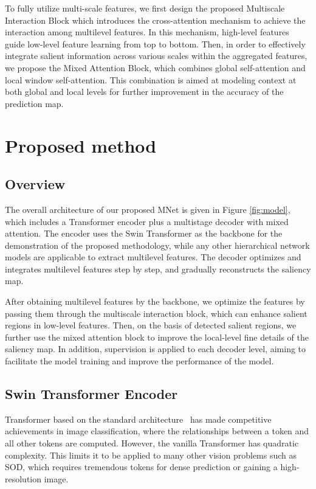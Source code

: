 \documentclass[lettersize,journal]{IEEEtran}
\begin{document}
To fully utilize multi-scale features, 
we first design the proposed Multiscale Interaction Block which introduces the cross-attention mechanism to achieve the interaction among multilevel features. 
In this mechanism, high-level features guide low-level feature learning from top to bottom. 
Then, in order to effectively integrate salient information across various scales within the aggregated features, 
we propose the Mixed Attention Block, which combines global self-attention and local window self-attention. 
This combination is aimed at modeling context at both global and local levels for further improvement in the accuracy of the prediction map. 

\section{Proposed method}
\subsection{Overview}
The overall architecture of our proposed MNet is given in Figure \ref{fig:model}, which includes a Transformer encoder plus a multistage decoder with mixed attention. The encoder uses the Swin Transformer as the backbone for the demonstration of the proposed methodology, while any other hierarchical network models are applicable to extract multilevel features. The decoder optimizes and integrates multilevel features step by step, and gradually reconstructs the saliency map.

After obtaining multilevel features by the backbone, we optimize the features by passing them through the multiscale interaction block, which can enhance salient regions in low-level features. Then, on the basis of detected salient regions, we further use the mixed attention block to improve the local-level fine details of the saliency map. In addition, supervision is applied to each decoder level, aiming to facilitate the model training and improve the performance of the model. 
\subsection{Swin Transformer Encoder}
Transformer based on the standard architecture~\cite{Vit} has made competitive achievements in image classification, where the relationships between a token and all other tokens are computed. However, the vanilla Transformer has quadratic complexity. This limits it to be applied to many other vision problems such as SOD, which requires tremendous tokens for dense prediction or gaining a high-resolution image. 
\end{document}
